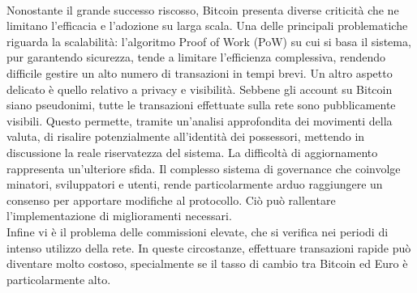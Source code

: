 \\Nonostante il grande successo riscosso, Bitcoin presenta diverse criticità che ne limitano l'efficacia e l'adozione su larga scala. Una delle principali problematiche riguarda la scalabilità: l'algoritmo Proof of Work (PoW) su cui si basa il sistema, pur garantendo sicurezza, tende a limitare l'efficienza complessiva, rendendo difficile gestire un alto numero di transazioni in tempi brevi.
Un altro aspetto delicato è quello relativo a privacy e visibilità. Sebbene gli account su Bitcoin siano pseudonimi, tutte le transazioni effettuate sulla rete sono pubblicamente visibili. Questo permette, tramite un'analisi approfondita dei movimenti della valuta, di risalire potenzialmente all'identità dei possessori, mettendo in discussione la reale riservatezza del sistema.
La difficoltà di aggiornamento rappresenta un'ulteriore sfida. Il complesso sistema di governance che coinvolge minatori, sviluppatori e utenti, rende particolarmente arduo raggiungere un consenso per apportare modifiche al protocollo. Ciò può rallentare l'implementazione di miglioramenti necessari.
\\Infine vi è il problema delle commissioni elevate, che si verifica nei periodi di intenso utilizzo della rete. In queste circostanze, effettuare transazioni rapide può diventare molto costoso, specialmente se il tasso di cambio tra Bitcoin ed Euro è particolarmente alto.

\newpage
